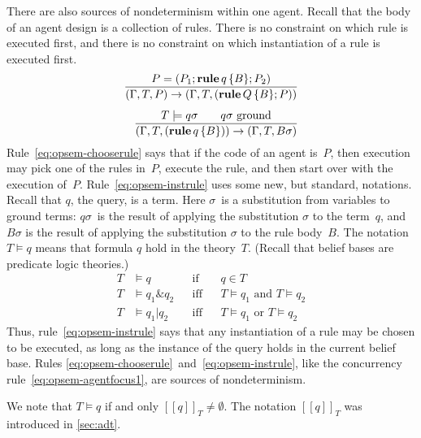 \documentclass[a4paper,12pt,oneside,fleqn]{book} %
\newcommand{\eval}[1]{[\!\![#1]\!\!]}
\begin{document}
There are also sources of nondeterminism within one agent. Recall that the
body of an agent design is a collection of rules. There is no constraint on
which rule is executed first, and there is no constraint on which
instantiation of a rule is executed first.
\begin{align}
\frac
  {P = (P_1;{\bf rule}\,q\,\{B\};P_2)}
  {(\Gamma,T,P)\to(\Gamma,T,({\bf rule}\,Q\,\{B\};P))}
  \label{eq:opsem-chooserule}
\\[1ex]
\frac
  {T \models q \sigma \qquad\text{$q\sigma$ ground}}
  {(\Gamma,T,({\bf rule}\,q\,\{B\}))\to(\Gamma,T,B\sigma)}
  \label{eq:opsem-instrule}
\end{align}
Rule~\eqref{eq:opsem-chooserule} says that if the code of an agent is~$P$,
then execution may pick one of the rules in~$P$, execute the rule, and then
start over with the execution of~$P$. Rule~\eqref{eq:opsem-instrule} uses
some new, but standard, notations. Recall that $q$, the query, is a term.
Here $\sigma$~is a substitution from variables to ground terms: $q\sigma$~is the result of applying the substitution $\sigma$ to the term~$q$, and
$B\sigma$ is the result of applying the substitution $\sigma$ to the rule
body~$B$. The notation $T\models q$ means that formula $q$ hold in the
theory~$T$. (Recall that belief bases are predicate logic theories.)
\begin{align}
T &\models q  &&\text{if} && q\in T \\
T &\models q_1\&q_2 &&\text{iff} &&\text{$T\models q_1$ and $T\models q_2$}\\
T &\models q_1|q_2 &&\text{iff} &&\text{$T\models q_1$ or $T\models q_2$}
\end{align}
Thus, rule~\eqref{eq:opsem-instrule} says that any instantiation of a rule
may be chosen to be executed, as long as the instance of the query holds in
the current belief base. Rules
\eqref{eq:opsem-chooserule}~and~\eqref{eq:opsem-instrule}, like the
concurrency rule~\eqref{eq:opsem-agentfocus1}, are sources of
nondeterminism.

\begin{remark}
We note that $T \models q$ if and only $\eval{q}_T\neq\emptyset$.
The notation $\eval{q}_T$ was introduced in \autoref{sec:adt}.
\end{remark}
\end{document}
